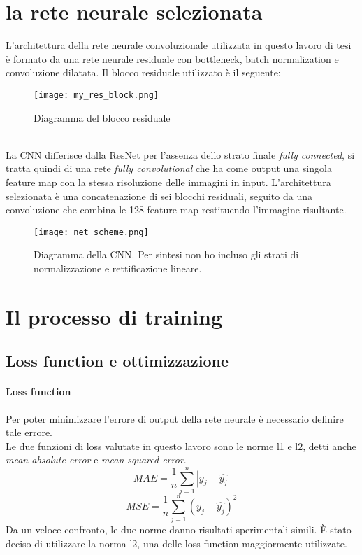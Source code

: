 \section{la rete neurale selezionata}
L'architettura della rete neurale convoluzionale utilizzata in questo lavoro di tesi è formato da una rete neurale residuale con bottleneck, batch normalization e convoluzione dilatata. Il blocco residuale utilizzato è il seguente:
\begin{figure}[ht]
    \centering
    \texttt{[image: my\_res\_block.png]}
    \caption[Diagramma del blocco residuale]{Diagramma del blocco residuale}
\end{figure}\\
La CNN differisce dalla ResNet per l'assenza dello strato finale \textit{fully connected}, si tratta quindi di una rete \textit{fully convolutional} che ha come output una singola feature map con la stessa risoluzione delle immagini in input. L'architettura selezionata è una concatenazione di sei blocchi residuali, seguito da una convoluzione che combina le 128 feature map restituendo l'immagine risultante.
\begin{figure}[ht]
    \centering
    \texttt{[image: net\_scheme.png]}
    \caption[Architettura della CNN]{Diagramma della CNN. Per sintesi non ho incluso gli strati di normalizzazione e rettificazione lineare.}
\end{figure}

\section{Il processo di training}
\subsection{Loss function e ottimizzazione}
\paragraph{Loss function} Per poter minimizzare l'errore di output della rete neurale è necessario definire tale errore.\\
Le due funzioni di loss valutate in questo lavoro sono le norme l1 e l2, detti anche \textit{mean absolute error} e \textit{mean squared error}.
$$MAE=\frac{1}{n} \sum_{j=1}^{n} |y_j-\hat{y_j}|$$
$$MSE=\frac{1}{n} \sum_{j=1}^{n} (y_j-\hat{y_j})^2$$
Da un veloce confronto, le due norme danno risultati sperimentali simili. È stato deciso di utilizzare la norma l2, una delle loss function maggiormente utilizzate.

